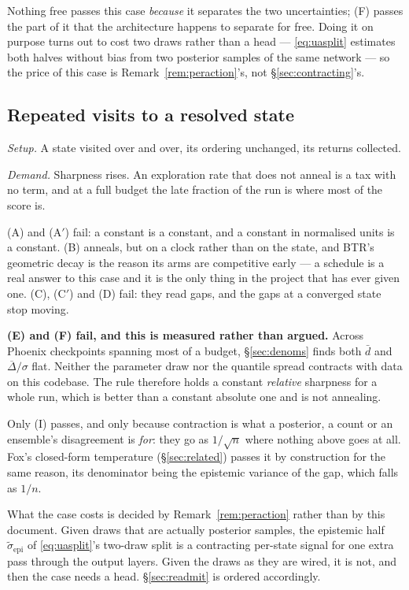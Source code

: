\documentclass{article}
\newcommand{\gapbar}{\overline{\Delta}}
\newcommand{\dbar}{\bar{d}}
\newcommand{\srank}{\sigma}
\begin{document}
Nothing free passes this case \emph{because} it separates the two uncertainties; (F) passes the
part of it that the architecture happens to separate for free. Doing it on purpose turns out to
cost two draws rather than a head --- \eqref{eq:uasplit} estimates both halves without bias from
two posterior samples of the same network --- so the price of this case is
Remark~\ref{rem:peraction}'s, not \S\ref{sec:contracting}'s.

\subsection{Repeated visits to a resolved state}
\label{sec:c11}

\emph{Setup.} A state visited over and over, its ordering unchanged, its returns collected.

\emph{Demand.} Sharpness rises. An exploration rate that does not anneal is a tax with no term,
and at a full budget the late fraction of the run is where most of the score is.

(A) and (A$'$) fail: a constant is a constant, and a constant in normalised units is a constant.
(B) anneals, but on a clock rather than on the state, and BTR's geometric decay is the reason its
arms are competitive early --- a schedule is a real answer to this case and it is the only thing
in the project that has ever given one. (C), (C$'$) and (D) fail: they read gaps, and the gaps at
a converged state stop moving.

\textbf{(E) and (F) fail, and this is measured rather than argued.} Across Phoenix checkpoints
spanning most of a budget, \S\ref{sec:denoms} finds both $\dbar$ and $\gapbar/\srank$ flat.
Neither
the parameter draw nor the quantile spread contracts with data on this codebase. The rule
therefore holds a constant \emph{relative} sharpness for a whole run, which is better than a
constant absolute one and is not annealing.

Only (I) passes, and only because contraction is what a posterior, a count or an ensemble's
disagreement is \emph{for}: they go as $1/\sqrt{n}$ where nothing above goes at all. Fox's
closed-form temperature (\S\ref{sec:related}) passes it by construction for the same reason, its
denominator being the epistemic variance of the gap, which falls as $1/n$.

What the case costs is decided by Remark~\ref{rem:peraction} rather than by this document. Given
draws that are actually posterior samples, the epistemic half $\tilde\sigma_{\mathrm{epi}}$ of
\eqref{eq:uasplit}'s two-draw split is a contracting per-state signal for one extra pass through the output layers. Given the draws as
they are wired, it is not, and then the case needs a head. \S\ref{sec:readmit} is ordered
accordingly.
\end{document}
